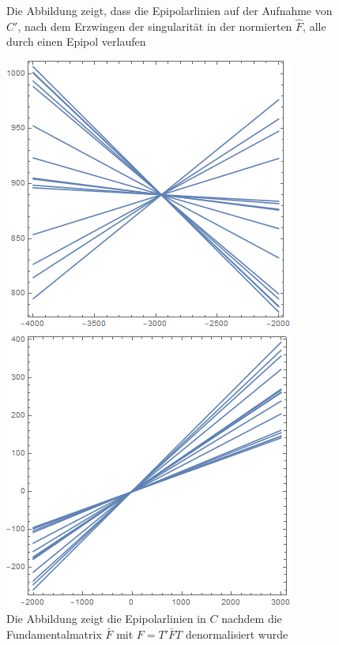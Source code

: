 \begin{figure}[!htb]
	\caption{Die Abbildung zeigt, dass die Epipolarlinien auf der Aufnahme von $C'$, nach dem Erzwingen der singularität in der normierten $\hat{F}$, alle durch einen Epipol verlaufen}
	\label{fig:EpipoleWithF2}
	\endminipage\hfill
\end{figure}

\begin{figure}[!htb]
	\includegraphics[width=\linewidth]{images/L_PC1_F_Constraint_denormalized.png}
	\caption{Die Abbildung zeigt die Epipolarlinien in $C$ nachdem die Fundamentalmatrix $\bar{F}$ mit $F = T'\bar{F}T$ denormalisiert wurde}
	\label{fig:EpipoleWithF1Denorm}
	\endminipage\hfill
	\includegraphics[width=\linewidth]{images/LPrime_PC2_F_Constraint_denormalized.png}

\end{figure}

